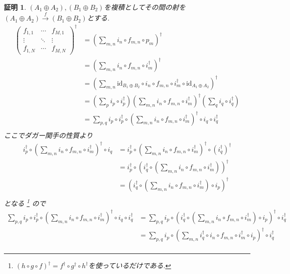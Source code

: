 \documentclass[a4paper,12pt]{ltjsarticle}
\theoremstyle{break}
\newtheorem*{prf}{証明}
\newcommand{\xr}[1]{\xrightarrow{#1}}
\newcommand{\id}{\mathrm{id}}
\newcommand{\ci}{\circ}
\newcommand{\da}{\dagger}
\newcommand{\opl}{\oplus}
\numberwithin{equation}{section}
\begin{document}
\begin{prf}
  $(A_1 \opl A_2), (B_1 \opl B_2)$を複積としてその間の射を$(A_1 \opl A_2) \xr{f} (B_1 \opl B_2)$とする. 
  \begin{align*}
      \begin{pmatrix}
      f_{1,1} & \cdots & f_{M,1} \\
      \vdots & \ddots & \vdots \\
      f_{1,N} & \cdots  & f_{M,N}
      \end{pmatrix}^\da
    &= \left( \sum_{m,n} i_n \ci f_{m,n} \ci p_m \right)^\da \\
    &= \left( \sum_{m,n} i_n \ci f_{m,n} \ci i_m^\da \right)^\da \\
    &= \left( \sum_{m,n} \id_{B_1 \opl B_2} \ci i_n \ci f_{m,n} \ci i_m^\da \ci \id_{A_1 \opl A_2}\right)^\da \\
    &= \left( \sum_p i_p \ci i_p^\da \right) \left( \sum_{m,n} i_n \ci f_{m,n} \ci i_m^\da \right)^\da \left( \sum_q i_q \ci i_q^\da \right) \\
    &= \sum_{p,q} i_p \ci i_p^\da \ci \left( \sum_{m,n} i_n \ci f_{m,n} \ci i_m^\da \right)^\da \ci i_q \ci i_q^\da \\
  \end{align*}
  ここでダガー関手の性質より
  \begin{align*}
    i_p^\da \ci \left( \sum_{m,n} i_n \ci f_{m,n} \ci i_m^\da \right)^\da \ci i_q 
    &= i_p^\da \ci \left( \sum_{m,n} i_n \ci f_{m,n} \ci i_m^\da \right)^\da \ci (i_q^\da)^\da \\
    &= i_p^\da \ci \left( i_q^\da \ci \left( \sum_{m,n} i_n \ci f_{m,n} \ci i_m^\da \right) \right)^\da \\
    &= \left( i_q^\da \ci \left( \sum_{m,n} i_n \ci f_{m,n} \ci i_m^\da \right) \ci i_p \right)^\da \\
  \end{align*}
  となる
  \footnote{
    $(h \ci g \ci f)^\da=f^\da \ci g^\da \ci h^\da$を使っているだけである. 
  }
  ので
  \begin{align*}
    \sum_{p,q} i_p \ci i_p^\da \ci \left( \sum_{m,n} i_n \ci f_{m,n} \ci i_m^\da \right)^\da \ci i_q \ci i_q^\da 
    &= \sum_{p,q} i_p \ci \left( i_q^\da \ci \left( \sum_{m,n} i_n \ci f_{m,n} \ci i_m^\da \right) \ci i_p \right)^\da \ci i_q^\da \\
    &= \sum_{p,q} i_p \ci \left( \sum_{m,n} i_q^\da \ci i_n \ci f_{m,n} \ci i_m^\da \ci i_p \right)^\da \ci i_q^\da \\

\end{align*}
\end{prf}
\end{document}
